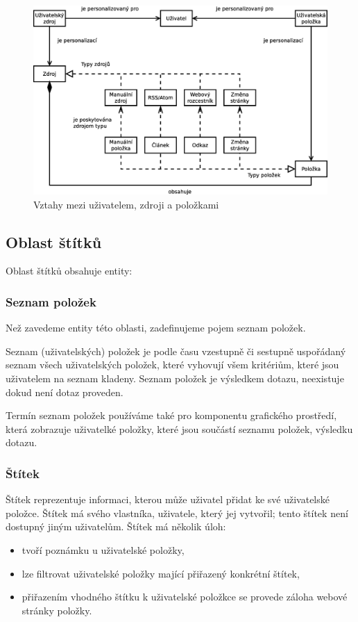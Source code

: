 \begin{figure}
    \centering
    \includegraphics[width=12cm]{img/zdroje-polozky.eps}
    \caption{Vztahy mezi uživatelem, zdroji a položkami}
    \label{fig:source-item}
\end{figure}

\subsection{Oblast štítků}

Oblast štítků obsahuje entity:

\subsubsection{Seznam položek}
Než zavedeme entity této oblasti, zadefinujeme pojem seznam položek.

Seznam (uživatelských) položek je podle času vzestupně či sestupně uspořádaný seznam všech uživatelských položek, které vyhovují všem kritériům, které jsou uživatelem na seznam kladeny.
Seznam položek je výsledkem dotazu, neexistuje dokud není dotaz proveden.

Termín seznam položek používáme také pro komponentu grafického prostředí, která zobrazuje uživatelké položky, které jsou součástí seznamu položek, výsledku dotazu.

\subsubsection{Štítek}
\label{sss:stitek}

Štítek reprezentuje informaci, kterou může uživatel přidat ke své uživatelské položce.
Štítek má svého vlastníka, uživatele, který jej vytvořil; tento štítek není dostupný jiným uživatelům.
Štítek má několik úloh:
\begin{itemize}
	\item tvoří poznámku u uživatelské položky,
	\item lze filtrovat uživatelské položky mající přiřazený konkrétní štítek,
	\item přiřazením vhodného štítku k uživatelské položkce se provede záloha webové stránky položky.
\end{itemize}

